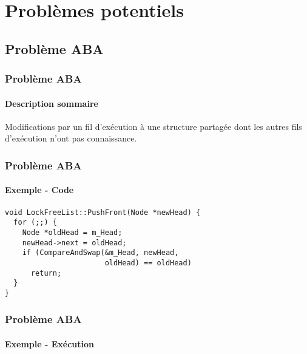 \documentclass{beamer}
\begin{document}
\section{Problèmes potentiels}
\subsection{Problème ABA}
\begin{frame}
\frametitle{Problème ABA}
\framesubtitle{Description sommaire}
Modifications par un fil d'exécution à une structure partagée dont les autres fils d'exécution n'ont pas connaissance.
\end{frame}

\begin{frame}[fragile]
\frametitle{Problème ABA}
\framesubtitle{Exemple - Code}
\begin{lstlisting}
void LockFreeList::PushFront(Node *newHead) {
  for (;;) {
    Node *oldHead = m_Head;
    newHead->next = oldHead;
    if (CompareAndSwap(&m_Head, newHead, 
                       oldHead) == oldHead)
      return;
  }
}
\end{lstlisting}
\end{frame}

\begin{frame}
\frametitle{Problème ABA}
\framesubtitle{Exemple - Exécution}
\end{frame}
\end{document}
